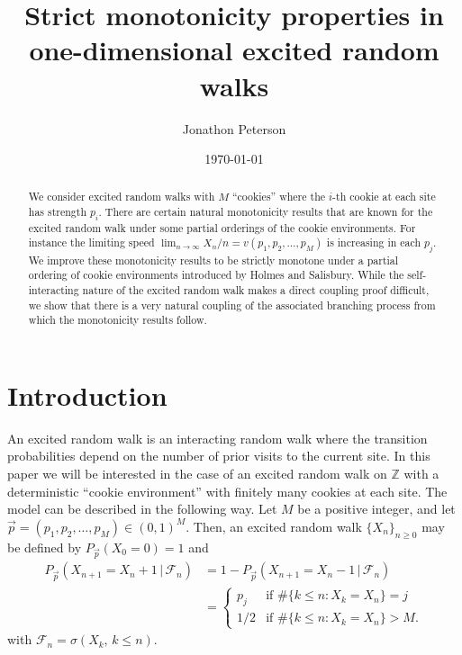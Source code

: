 \documentclass[reqno,letterpaper,11pt]{amsart}
\theoremstyle{remark}
\theoremstyle{definition}
\begin{document}
\title[Monotonicity in excited random walks]{Strict monotonicity properties in one-dimensional excited random walks}
\author{Jonathon Peterson}
\address{Jonathon Peterson \\  Purdue University \\ Department of Mathematics \\ 150 N University Street \\ West Lafayette, IN  47907 \\ USA}


\date{\today}

\begin{abstract}
 We consider excited random walks with $M$ ``cookies'' where the $i$-th cookie at each site has strength $p_i$. 
There are certain natural monotonicity results that are known for the excited random walk under some partial orderings of the cookie environments. For instance the limiting speed $\lim_{n{\rightarrow}\infty} X_n/n = v(p_1,p_2,\ldots, p_M)$ is increasing in each $p_j$. 
We improve these monotonicity results to be strictly monotone under a partial ordering of cookie environments introduced by Holmes and Salisbury.
While the self-interacting nature of the excited random walk makes a direct coupling proof difficult, we show that there is a very natural coupling of the associated branching process from which the monotonicity results follow.  
\end{abstract}

\maketitle

\section{Introduction}
An excited random walk is an interacting random walk where the transition probabilities depend on the number of prior visits to the current site. In this paper we will be interested in the case of an excited random walk on ${\mathbb Z}$ with a deterministic ``cookie environment'' with finitely many cookies at each site. The model can be described in the following way. Let $M$ be a positive integer, and let $\vec{p} = (p_1,p_2,\ldots, p_M) \in (0,1)^M$. Then, an excited random walk $\{X_n\}_{n\geq 0}$ may be defined by $P_{\vec{p}} (X_0 = 0) = 1$ and 
\begin{align*}
 P_{\vec{p}}(X_{n+1} = X_n + 1 \, | \, \mathcal{F}_n ) 
& = 1 - P_{\vec{p}}(X_{n+1} = X_n - 1 \, | \, \mathcal{F}_n ) \\
&=
\begin{cases}
 p_j & \text{if } \#\{k\leq n: X_k = X_n \} = j \\
 1/2 & \text{if } \#\{k\leq n: X_k = X_n \} > M. 
\end{cases}
\end{align*}
with $\mathcal{F}_n = {\sigma}(X_k, \, k\leq n)$.
\end{document}
